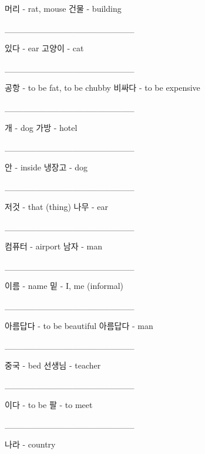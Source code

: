 \documentclass[addpoints, 30pt]{../exam}%
\begin{document}
\begin{questions}
\begin{choices}
\choice%
머리 {-} rat, mouse%
\CorrectChoice%
건물 {-} building%
\end{choices}%
\question[1]%
\_\_\_\_\_\_\_\_\_\_\_\_\_\_\_\_\_\_\_\_\_%
\begin{choices}%
\choice%
있다 {-} ear%
\CorrectChoice%
고양이 {-} cat%
\end{choices}%
\question[1]%
\_\_\_\_\_\_\_\_\_\_\_\_\_\_\_\_\_\_\_\_\_%
\begin{choices}%
\choice%
공항 {-} to be fat, to be chubby%
\CorrectChoice%
비싸다 {-} to be expensive%
\end{choices}%
\question[1]%
\_\_\_\_\_\_\_\_\_\_\_\_\_\_\_\_\_\_\_\_\_%
\begin{choices}%
\CorrectChoice%
개 {-} dog%
\choice%
가방 {-} hotel%
\end{choices}%
\question[1]%
\_\_\_\_\_\_\_\_\_\_\_\_\_\_\_\_\_\_\_\_\_%
\begin{choices}%
\CorrectChoice%
안 {-} inside%
\choice%
냉장고 {-} dog%
\end{choices}%
\question[1]%
\_\_\_\_\_\_\_\_\_\_\_\_\_\_\_\_\_\_\_\_\_%
\begin{choices}%
\CorrectChoice%
저것 {-} that (thing)%
\choice%
나무 {-} ear%
\end{choices}%
\question[1]%
\_\_\_\_\_\_\_\_\_\_\_\_\_\_\_\_\_\_\_\_\_%
\begin{choices}%
\choice%
컴퓨터 {-} airport%
\CorrectChoice%
남자 {-} man%
\end{choices}%
\question[1]%
\_\_\_\_\_\_\_\_\_\_\_\_\_\_\_\_\_\_\_\_\_%
\begin{choices}%
\CorrectChoice%
이름 {-} name%
\choice%
밑 {-} I, me (informal)%
\end{choices}%
\question[1]%
\_\_\_\_\_\_\_\_\_\_\_\_\_\_\_\_\_\_\_\_\_%
\begin{choices}%
\CorrectChoice%
아름답다 {-} to be beautiful%
\choice%
아름답다 {-} man%
\end{choices}%
\question[1]%
\_\_\_\_\_\_\_\_\_\_\_\_\_\_\_\_\_\_\_\_\_%
\begin{choices}%
\choice%
중국 {-} bed%
\CorrectChoice%
선생님 {-} teacher%
\end{choices}%
\question[1]%
\_\_\_\_\_\_\_\_\_\_\_\_\_\_\_\_\_\_\_\_\_%
\begin{choices}%
\CorrectChoice%
이다 {-} to be%
\choice%
팔 {-} to meet%
\end{choices}%
\question[1]%
\_\_\_\_\_\_\_\_\_\_\_\_\_\_\_\_\_\_\_\_\_%
\begin{choices}%
\CorrectChoice%
나라 {-} country%
\choice%

\end{choices}
\end{questions}
\end{document}
